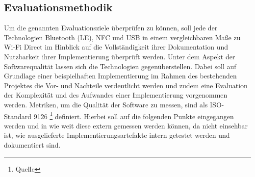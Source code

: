 \documentclass[12pt,a4paper]{article}
\begin{document}
    \subsection{Evaluationsmethodik}
    	Um die genannten Evaluationsziele überprüfen zu können, soll jede der Technologien Bluetooth (LE), NFC und USB in einem vergleichbaren Maße zu Wi-Fi Direct im Hinblick auf die Vollständigkeit ihrer Dokumentation und Nutzbarkeit ihrer Implementierung überprüft werden.
    	Unter dem Aspekt der Softwarequalität lassen sich die Technologien gegenüberstellen. Dabei soll auf Grundlage einer beispielhaften Implementierung im Rahmen des bestehenden Projektes die Vor- und Nachteile verdeutlicht werden und zudem eine Evaluation der Komplexität und des Aufwandes einer Implementierung vorgenommen werden. Metriken, um die Qualität der Software zu messen, sind als ISO-Standard 9126 \footnote{Quelle} definiert. Hierbei soll auf die folgenden Punkte eingegangen werden und in wie weit diese extern gemessen werden können, da nicht einsehbar ist, wie ausgelieferte Implementierungsartefakte intern getestet werden und dokumentiert sind.
\end{document}
